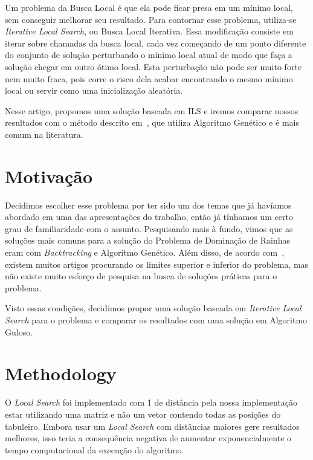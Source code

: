 \documentclass[sigconf]{acmart}
\begin{document}
Um problema da Busca Local é que ela pode ficar presa em um mínimo local, sem conseguir melhorar
seu resultado. Para contornar esse problema, utiliza-se \textit{Iterative Local Search},
ou Busca Local Iterativa. Essa modificação consiste em iterar sobre chamadas da busca local, 
cada vez começando de um ponto diferente do conjunto de solução perturbando o mínimo local atual 
de modo que faça a solução chegar em outro ótimo local. Esta perturbação não pode ser muito forte nem 
muito fraca, pois corre o risco dela acabar encontrando o mesmo mínimo local ou servir como uma inicialização
aleatória.~\cite{lourencco2010iterated}

  Nesse artigo, propomos uma solução baseada em ILS e iremos comparar
nossos resultados com o método descrito em~\cite{alharbi2017genetic}, 
que utiliza Algoritmo Genético e é mais comum na literatura.

\section{Motivação}

Decidimos escolher esse problema por ter sido um dos temas que já
havíamos abordado em uma das apresentações do trabalho, então já 
tínhamos um certo grau de familiaridade com o assunto. Pesquisando mais
à fundo, vimos que as soluções mais comuns para a solução do Problema 
de Dominação de Rainhas eram com \textit{Backtracking} e Algoritmo Genético.
Além disso, de acordo com~\cite{alharbi2017genetic}, existem muitos artigos procurando
os limites superior e inferior do problema, mas não existe muito esforço de pesquisa
na busca de soluções práticas para o problema.

Visto essas condições, decidimos propor uma solução baseada em \textit{Iterative
Local Search} para o problema e comparar os resultados com uma solução em
Algoritmo Guloso.

\section{Methodology}

O \textit{Local Search} foi implementado com 1 de distância pela nossa implementação
estar utilizando uma matriz e não um vetor contendo todas as posições do tabuleiro. Embora usar um
\textit{Local Search} com distâncias maiores gere resultados melhores, isso teria a consequência
negativa de aumentar exponencialmente o tempo computacional da execução do algoritmo.
\end{document}
